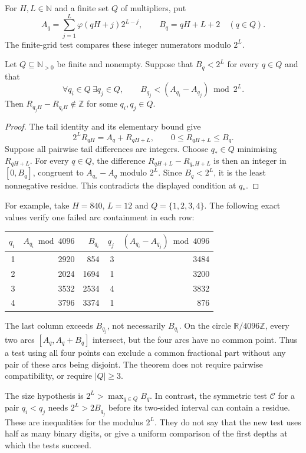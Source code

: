 For $H,L\in\mathbb N$ and a finite set $Q$ of multipliers, put
\[
 A_q=\sum_{j=1}^{L}\varphi(qH+j)2^{L-j},\qquad
 B_q=qH+L+2\quad(q\in Q).
\]
The finite-grid test compares these integer numerators modulo $2^L$.

\begin{thm}\label{catalogue:cert:b10a}
Let $Q\subseteq\mathbb N_{>0}$ be finite and nonempty. Suppose that
$B_q<2^L$ for every $q\in Q$ and that
\[
 \forall q_i\in Q\ \exists q_j\in Q,\qquad
 B_{q_j}<(A_{q_i}-A_{q_j})\bmod2^L.
\]
Then $R_{q_jH}-R_{q_iH}\notin\mathbb Z$ for some $q_i,q_j\in Q$.
\end{thm}
\begin{proof}
The tail identity and its elementary bound give
\[
 2^LR_{qH}=A_q+R_{qH+L},\qquad 0\le R_{qH+L}\le B_q.
\]
Suppose all pairwise tail differences are integers. Choose $q_*\in Q$
minimising $R_{qH+L}$. For every $q\in Q$, the difference
$R_{qH+L}-R_{q_*H+L}$ is then an integer in $[0,B_q]$, congruent to
$A_{q_*}-A_q$ modulo $2^L$. Since $B_q<2^L$, it is the least
nonnegative residue. This contradicts the displayed condition at $q_*$.
\end{proof}

For example, take $H=840$, $L=12$ and $Q=\{1,2,3,4\}$.
The following exact values verify one failed arc containment in each row:
\begin{center}
\begin{tabular}{rrrrr}
$q_i$ & $A_{q_i}\bmod4096$ & $B_{q_i}$ & $q_j$ & $(A_{q_i}-A_{q_j})\bmod4096$\\
\hline
1 & 2920 & 854  & 3 & 3484\\
2 & 2024 & 1694 & 1 & 3200\\
3 & 3532 & 2534 & 4 & 3832\\
4 & 3796 & 3374 & 1 & 876
\end{tabular}
\end{center}
The last column exceeds $B_{q_j}$, not necessarily $B_{q_i}$.
On the circle $\mathbb R/4096\mathbb Z$, every two arcs
$[A_q,A_q+B_q]$ intersect, but the four arcs have no common point.
Thus a test using all four points can exclude a common fractional part
without any pair of these arcs being disjoint. The theorem does not
require pairwise compatibility, or require $|Q|\ge3$.

The size hypothesis is $2^L>\max_{q\in Q}B_q$. In contrast, the
symmetric test $\mathcal C$ for a pair $q_i<q_j$ needs
$2^L>2B_{q_j}$ before its two-sided interval can contain a residue.
These are inequalities for the modulus $2^L$. They do not say that the
new test uses half as many binary digits, or give a uniform comparison
of the first depths at which the tests succeed.


